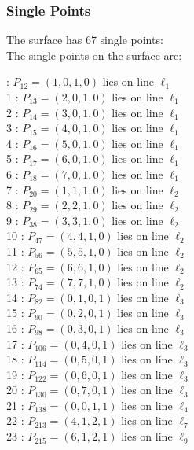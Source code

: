 \documentclass{article}
\begin{document}
{\subsubsection*{Single Points}
The surface has 67 single points:\\
The single points on the surface are:\\
\begin{multicols}{2}
 : $P_{12}=( 1, 0, 1, 0 )$ lies on line $\ell_{1}$\\
1 : $P_{13}=( 2, 0, 1, 0 )$ lies on line $\ell_{1}$\\
2 : $P_{14}=( 3, 0, 1, 0 )$ lies on line $\ell_{1}$\\
3 : $P_{15}=( 4, 0, 1, 0 )$ lies on line $\ell_{1}$\\
4 : $P_{16}=( 5, 0, 1, 0 )$ lies on line $\ell_{1}$\\
5 : $P_{17}=( 6, 0, 1, 0 )$ lies on line $\ell_{1}$\\
6 : $P_{18}=( 7, 0, 1, 0 )$ lies on line $\ell_{1}$\\
7 : $P_{20}=( 1, 1, 1, 0 )$ lies on line $\ell_{2}$\\
8 : $P_{29}=( 2, 2, 1, 0 )$ lies on line $\ell_{2}$\\
9 : $P_{38}=( 3, 3, 1, 0 )$ lies on line $\ell_{2}$\\
10 : $P_{47}=( 4, 4, 1, 0 )$ lies on line $\ell_{2}$\\
11 : $P_{56}=( 5, 5, 1, 0 )$ lies on line $\ell_{2}$\\
12 : $P_{65}=( 6, 6, 1, 0 )$ lies on line $\ell_{2}$\\
13 : $P_{74}=( 7, 7, 1, 0 )$ lies on line $\ell_{2}$\\
14 : $P_{82}=( 0, 1, 0, 1 )$ lies on line $\ell_{3}$\\
15 : $P_{90}=( 0, 2, 0, 1 )$ lies on line $\ell_{3}$\\
16 : $P_{98}=( 0, 3, 0, 1 )$ lies on line $\ell_{3}$\\
17 : $P_{106}=( 0, 4, 0, 1 )$ lies on line $\ell_{3}$\\
18 : $P_{114}=( 0, 5, 0, 1 )$ lies on line $\ell_{3}$\\
19 : $P_{122}=( 0, 6, 0, 1 )$ lies on line $\ell_{3}$\\
20 : $P_{130}=( 0, 7, 0, 1 )$ lies on line $\ell_{3}$\\
21 : $P_{138}=( 0, 0, 1, 1 )$ lies on line $\ell_{4}$\\
22 : $P_{213}=( 4, 1, 2, 1 )$ lies on line $\ell_{7}$\\
23 : $P_{215}=( 6, 1, 2, 1 )$ lies on line $\ell_{9}$\\

\end{multicols}}
\end{document}
